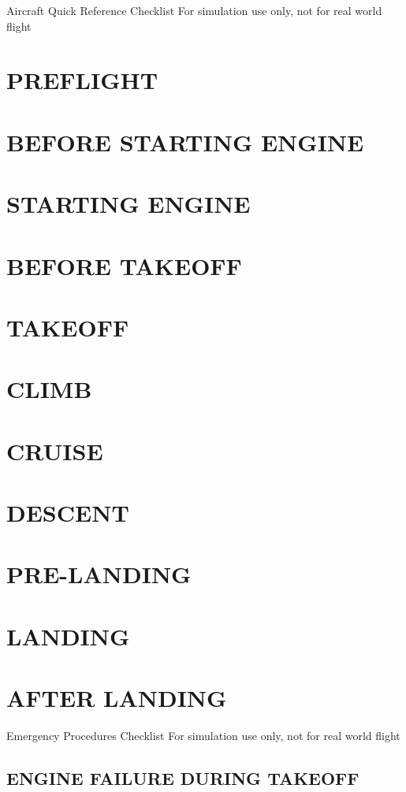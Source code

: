\documentclass{article}
\begin{document}
\begin{center}
    {\fontsize{25}{70}\selectfont Aircraft}
    \break
    {\fontsize{20.74}{70}\selectfont Quick Reference Checklist}
    \break
    \color{Red}
    {\fontsize{10}{70}\selectfont For simulation use only, not for real world flight}
\end{center}
\vspace{-2em}
\begin{multicols*}{2}
\section*{PREFLIGHT}
\section*{BEFORE STARTING ENGINE}
\section*{STARTING ENGINE}
\section*{BEFORE TAKEOFF}
\section*{TAKEOFF}
\section*{CLIMB}
\section*{CRUISE}
\section*{DESCENT}
\section*{PRE-LANDING}
\section*{LANDING}
\section*{AFTER LANDING}

\end{multicols*}
\newpage
\begin{center}
    {\fontsize{20.74}{70}\selectfont Emergency Procedures Checklist}
    \break
    \color{Red}
    {\fontsize{10}{70}\selectfont For simulation use only, not for real world flight}
\end{center}
\vspace*{-2em}
\begin{multicols*}{2}
\section*{ENGINE FAILURE DURING TAKEOFF}
\end{multicols*}
\end{document}
